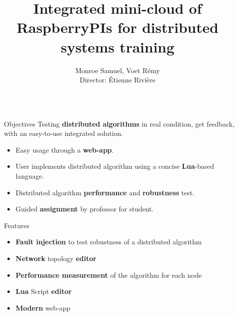 \documentclass[final,hyperref={pdfpagelabels=false}]{beamer}
\title{\huge Integrated mini-cloud of RaspberryPIs for distributed systems training} %
\author{Monroe Samuel, Voet Rémy \\
Director: Étienne Rivière} %
\institute{UCLouvain} %
\begin{document}

\begin{frame}[t] %

\begin{columns}[t] %

\begin{column}{.02\textwidth}\end{column} %

\begin{column}{.465\textwidth} %
            
\begin{block}{Objectives}
Testing \textbf{distributed algorithms} in real condition, get feedback, with an easy-to-use integrated solution.
\begin{itemize}
    \item Easy usage through a \textbf{web-app}.
    \item User implements distributed algorithm using a concise \textbf{Lua}-based language.
    \item Distributed algorithm \textbf{performance} and \textbf{robustness} test.
    \item Guided \textbf{assignment} by professor for student.
\end{itemize}

\end{block}

\begin{block}{Features}

\begin{itemize}
    \item \textbf{Fault injection} to test robustness of a distributed algorithm
    \item \textbf{Network} topology \textbf{editor}
    \item \textbf{Performance measurement} of the algorithm for each node
    \item \textbf{Lua} Script \textbf{editor}
    \item \textbf{Modern} web-app
\end{itemize}

\end{block}


\end{column}
\end{columns}
\end{frame}
\end{document}
